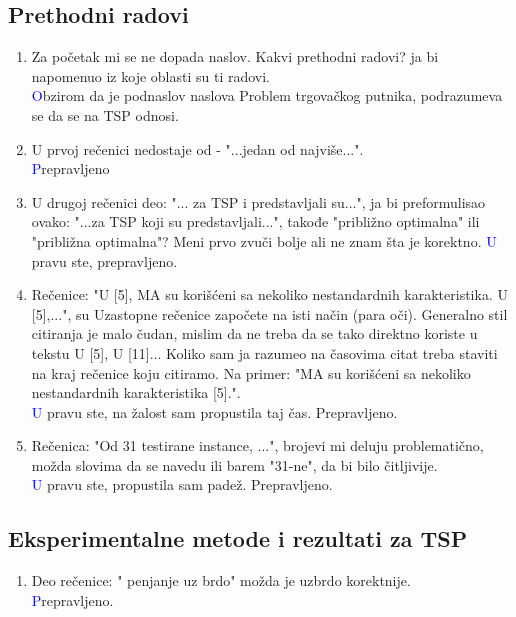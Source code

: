 \documentclass[a4paper]{report}
\newcommand{\odgovor}[1]{\textcolor{blue}{#1}}
\begin{document}
\subsection{Prethodni radovi}
\begin{enumerate}
  \item Za početak mi se ne dopada naslov. Kakvi prethodni radovi? ja bi napomenuo iz koje oblasti su ti radovi. \\
  \odgovor Obzirom da je podnaslov naslova Problem trgovačkog putnika, podrazumeva se da se na TSP odnosi. 
  
  \item U prvoj rečenici nedostaje od -  "...jedan od najviše...".\\
  \odgovor Prepravljeno 
  \item U drugoj rečenici deo: "... za TSP i predstavljali su...", ja bi preformulisao ovako:  "...za TSP koji su predstavljali...", takođe "približno optimalna" ili "približna optimalna"? Meni prvo zvuči bolje ali ne znam šta je korektno.
  \odgovor U pravu ste, prepravljeno. 
  
  \item Rečenice: "U [5], MA su korišćeni sa nekoliko nestandardnih karakteristika. U
[5],...", su Uzastopne rečenice započete na isti način (para oči). Generalno stil citiranja je malo čudan, mislim da ne treba da se tako direktno koriste u tekstu 
U [5], U [11]... Koliko sam ja razumeo na časovima citat treba staviti na kraj rečenice koju citiramo. Na primer: "MA su korišćeni sa nekoliko nestandardnih karakteristika [5].". \\
 \odgovor U pravu ste, na žalost sam propustila taj čas. Prepravljeno. 

  \item Rečenica: "Od 31 testirane instance, ...", brojevi mi deluju problematično, možda slovima da se navedu ili barem "31-ne", da bi bilo čitljivije.\\
  \odgovor U pravu ste, propustila sam padež. Prepravljeno.
\end{enumerate}

\subsection{Eksperimentalne metode i rezultati za TSP}
\begin{enumerate}
  \item Deo rečenice: " penjanje uz brdo" možda je uzbrdo korektnije. \\
  \odgovor Prepravljeno.
  
\end{enumerate}
\end{document}
